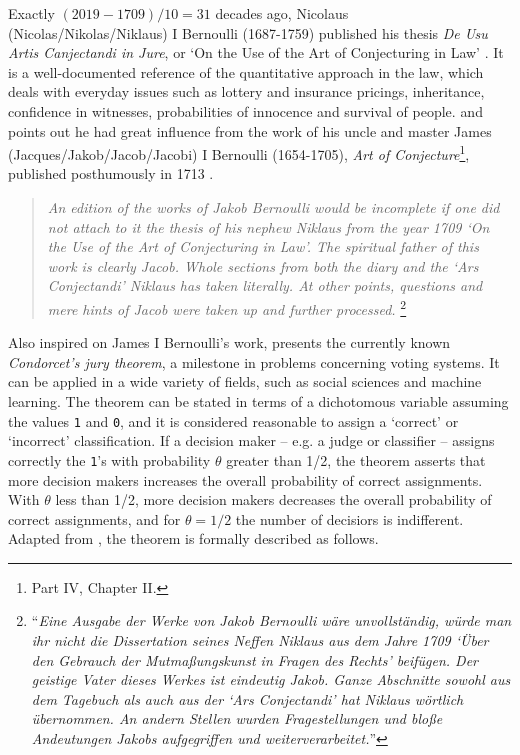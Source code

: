 \documentclass[a4paper]{exam}
\theoremstyle{plain}
\begin{document}
Exactly $(2019-1709)/10 = 31$ decades ago, Nicolaus (Nicolas/Nikolas/Niklaus) I Bernoulli (1687-1759) published his thesis \textit{De Usu Artis Canjectandi in Jure}, or `On the Use of the Art of Conjecturing in Law' \cite{bernoulli1709dissertatio}. It is a well-documented reference of the quantitative approach in the law, which deals with everyday issues such as lottery and insurance pricings, inheritance, confidence in witnesses, probabilities of innocence and survival of people. \cite{kohli1975kommentar} and \cite{hald2003history} points out he had great influence from the work of his uncle and master James (Jacques/Jakob/Jacob/Jacobi) I Bernoulli (1654-1705), \textit{Art of Conjecture}\footnote{ Part IV, Chapter II.}, published posthumously in 1713 \cite{bernoulli1713ars}.
\begin{quote}
\textit{An edition of the works of Jakob Bernoulli would be incomplete if one did not attach to it the thesis of his nephew Niklaus from the year 1709 `On the Use of the Art of Conjecturing in Law'. The spiritual father of this work is clearly Jacob. Whole sections from both the diary and the `Ars Conjectandi' Niklaus has taken literally. At other points, questions and mere hints of Jacob were taken up and further processed.} \cite[p. 541]{kohli1975kommentar}\footnote{ ``\textit{Eine Ausgabe der Werke von Jakob Bernoulli wäre unvollständig, würde man ihr nicht die Dissertation seines Neffen Niklaus aus dem Jahre 1709 `Über den Gebrauch der Mutmaßungskunst in Fragen des Rechts' beifügen. Der geistige Vater dieses Werkes ist eindeutig Jakob. Ganze Abschnitte sowohl aus dem Tagebuch als auch aus der `Ars Conjectandi' hat Niklaus wörtlich übernommen. An andern Stellen wurden Fragestellungen und bloße Andeutungen Jakobs aufgegriffen und weiterverarbeitet.}''}
\end{quote}

Also inspired on James I Bernoulli's work, \cite{condorcet1785essay} presents the currently known \textit{Condorcet's jury theorem}, a milestone in problems concerning voting systems. It can be applied in a wide variety of fields, such as social sciences and machine learning. The theorem can be stated in terms of a dichotomous variable assuming the values \texttt{1} and \texttt{0}, and it is considered reasonable to assign a `correct' or `incorrect' classification. If a decision maker -- e.g. a judge or classifier -- assigns correctly the \texttt{1}'s with probability $\theta$ greater than 1/2, the theorem asserts that more decision makers increases the overall probability of correct assignments. With $\theta$ less than 1/2, more decision makers decreases the overall probability of correct assignments, and for $\theta = 1/2$ the number of decisiors is indifferent. Adapted from \cite{berg1996condorcet}, the theorem is formally described as follows.
\end{document}
